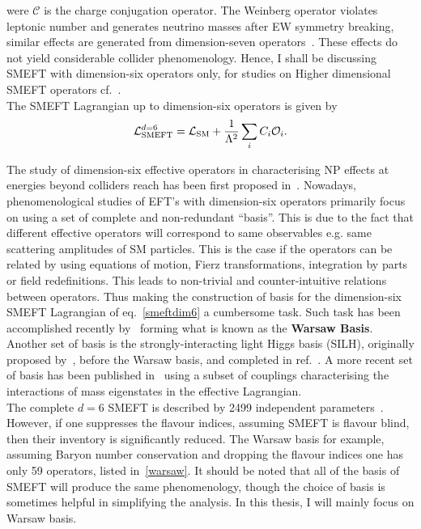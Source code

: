 were $ \mathcal{C}$ is the charge conjugation operator. The Weinberg operator violates leptonic number and generates neutrino masses after EW symmetry breaking, similar effects are generated from dimension-seven operators~\cite{Lehman:2014jma}. These effects do not yield considerable collider phenomenology. Hence, I shall be discussing SMEFT with dimension-six operators only, for studies on Higher dimensional SMEFT operators cf.~\cite{Lehman:2014jma,Lehman:2015coa,Henning:2015alf,Aguilar-Saavedra:2010uur}. \\ The SMEFT Lagrangian up to dimension-six operators is given by
\begin{equation}
	\mathcal{L}_{\mathrm{SMEFT}}^{d=6}=\mathcal{L}_{\mathrm{SM}} + \frac{1}{\Lambda^2}\sum_i C_i  {\cal O}_i.
	\label{smeftdim6}
\end{equation}

The study of dimension-six effective operators in characterising NP effects at energies beyond colliders reach has been first proposed in~\cite{BUCHMULLER1986621,Hagiwara:1993ck}. Nowadays,  phenomenological studies of EFT's with dimension-six operators primarily focus on using a set of complete and non-redundant ``basis''. This is due to the fact that different effective operators will correspond to same observables e.g. same scattering amplitudes of SM particles.  This is the case if the operators can be related by using equations of motion, Fierz transformations, integration by parts or field redefinitions. This leads to non-trivial and counter-intuitive relations between operators. Thus making the construction of basis for the dimension-six SMEFT Lagrangian of eq.~\eqref{smeftdim6} a cumbersome task. Such task has been accomplished recently by~\cite{Grzadkowski:2010es,Alonso:2013hga} forming what is known as the \textbf{Warsaw Basis}.  Another set of basis is the strongly-interacting light Higgs basis (SILH), originally proposed by~\cite{Giudice:2007fh}, before the Warsaw basis, and completed in ref.~\cite{Contino:2013kra, Elias-Miro:2013eta}. A more recent set of basis has been published in~\cite{Gupta:2014rxa} using a subset of couplings characterising the interactions of mass eigenstates in the effective Lagrangian.\\
The complete $d=6$ SMEFT is described by 2499 independent parameters~\cite{Alonso:2013hga}. However, if one suppresses the flavour indices, assuming SMEFT is flavour blind, then their inventory is significantly reduced. The Warsaw basis for example, assuming Baryon number conservation and dropping the flavour indices one has only 59 operators, listed in~\autoref{warsaw}. It should be noted that all of the basis of SMEFT will produce the same phenomenology, though the choice of basis is sometimes helpful in simplifying the analysis. In this thesis, I will mainly focus on Warsaw basis.\\ 
